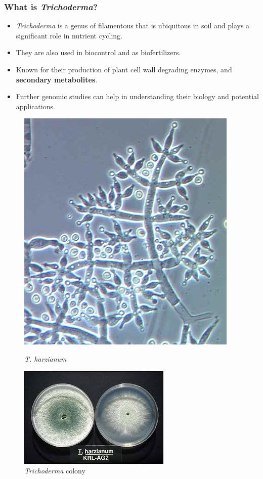 \documentclass[t]{beamer}
\begin{document}
\begin{frame}
	\frametitle{What is \textit{Trichoderma}?}
	\begin{itemize}
		\item \textit{Trichoderma} is a genus of filamentous that is ubiquitous in soil and plays a significant role in nutrient cycling.
		\item They are also used in biocontrol and as biofertilizers.
		\item Known for their production of plant cell wall degrading enzymes, and \textbf{secondary metabolites}.
		\item Further genomic studies can help in understanding their biology and potential applications.
	\end{itemize}
	\vspace{0.05cm}
	\centering

	\begin{figure}
		\centering
		\begin{minipage}{0.5\textwidth}
			\centering
			\includegraphics[width=0.35\linewidth]{./Trichoderma_harzianum.jpg}
			\caption{\textit{T. harzianum}}
		\end{minipage}\hfill
		\begin{minipage}{0.48\textwidth}
			\centering
			\includegraphics[width=0.6\linewidth]{./Trichoderma_petri.jpg}
			\caption{\textit{Trichoderma} colony}
		\end{minipage}
	\end{figure}
\end{frame}
\end{document}
